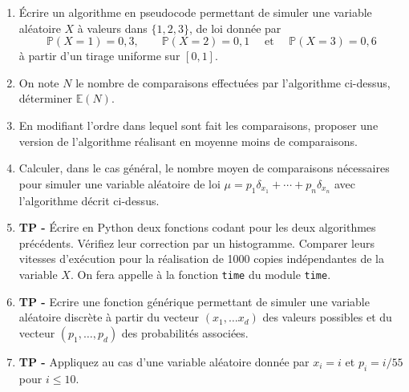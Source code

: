 \documentclass[solutions]{exercices}
\begin{document}
\begin{exercice}
\begin{enumerate}
\item Écrire un algorithme en pseudocode permettant de simuler une variable aléatoire $X$ à valeurs dans $\{1,2,3\}$, de loi donn\'ee par $$\mathbb{P} (X = 1) = 0,3, \qquad \mathbb{P} (X = 2) = 0,1 \quad \text{ et }\quad \mathbb{P} (X = 3) = 0,6$$ à partir d'un tirage uniforme sur $[0,1]$.
\item On note $N$ le nombre de comparaisons effectuées par l'algorithme ci-dessus, déterminer $\mathbb{E}(N)$.
\item En modifiant l'ordre dans lequel sont fait les comparaisons, proposer une version de l'algorithme réalisant en moyenne moins de comparaisons.
\item Calculer, dans le cas général, le nombre moyen de comparaisons nécessaires pour simuler une variable aléatoire de loi $\mu = p_1 \delta_{x_1} + \cdots + p_n \delta_{x_n}$ avec l'algorithme décrit ci-dessus.
\item \textbf{TP -} Écrire en Python deux fonctions codant pour les deux algorithmes précédents. Vérifiez leur correction par un histogramme. Comparer leurs vitesses d'exécution pour la réalisation de 1000 copies indépendantes de la variable $X$.  On fera appelle à la fonction \texttt{time} du module \texttt{time}.
\item\textbf{TP -} Ecrire une fonction générique permettant de simuler une variable aléatoire discrète à partir du vecteur $(x_1, \dots x_d)$ des valeurs possibles et du vecteur $(p_1, \dots, p_d)$ des probabilités associées.
\item \textbf{TP -} Appliquez au cas d'une variable aléatoire donnée par $x_i = i$ et $p_i = i/55$ pour $i \leq 10$.
\end{enumerate}
\end{exercice}
\end{document}
